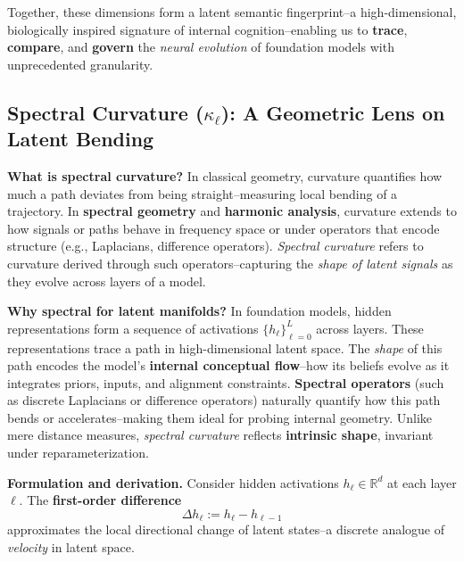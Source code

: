 Together, these dimensions form a latent semantic fingerprint--a high-dimensional, biologically inspired signature of internal cognition--enabling us to \textbf{trace}, \textbf{compare}, and \textbf{govern} the \emph{neural evolution} of foundation models with unprecedented granularity.





\subsection{Spectral Curvature ($\kappa_\ell$): A Geometric Lens on Latent Bending}

\noindent
\textbf{What is spectral curvature?} In classical geometry, curvature quantifies how much a path deviates from being straight--measuring local bending of a trajectory. In \textbf{spectral geometry} and \textbf{harmonic analysis}, curvature extends to how signals or paths behave in frequency space or under operators that encode structure (e.g., Laplacians, difference operators). \emph{Spectral curvature} refers to curvature derived through such operators--capturing the \emph{shape of latent signals} as they evolve across layers of a model.

\vspace{0.8em}

\noindent
\textbf{Why spectral for latent manifolds?}  
In foundation models, hidden representations form a sequence of activations $\{ h_\ell \}_{\ell=0}^L$ across layers. These representations trace a path in high-dimensional latent space. The \emph{shape} of this path encodes the model’s \textbf{internal conceptual flow}--how its beliefs evolve as it integrates priors, inputs, and alignment constraints. \textbf{Spectral operators} (such as discrete Laplacians or difference operators) naturally quantify how this path bends or accelerates--making them ideal for probing internal geometry. Unlike mere distance measures, \emph{spectral curvature} reflects \textbf{intrinsic shape}, invariant under reparameterization.

\vspace{0.8em}

\noindent
\textbf{Formulation and derivation.}  
Consider hidden activations $h_\ell \in \mathbb{R}^d$ at each layer $\ell$. The \textbf{first-order difference}
\[
\Delta h_\ell := h_\ell - h_{\ell-1}
\]
approximates the local directional change of latent states--a discrete analogue of \emph{velocity} in latent space.

